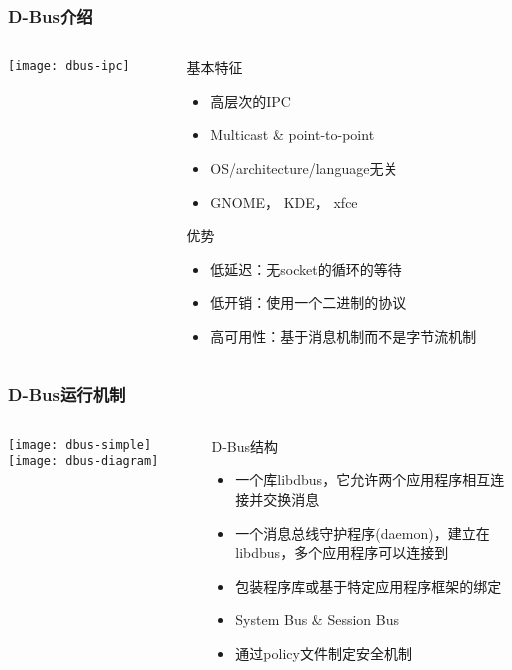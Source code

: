 \begin{frame}[fragile]
	\frametitle{D-Bus介绍}
	
	\begin{columns}
		\begin{column}{.4\textwidth}
			
			\texttt{[image: dbus-ipc]}
			
		\end{column}
		\begin{column}{.6\textwidth}
			基本特征
			\begin{itemize}
				\item 高层次的IPC
				\item Multicast \& point-to-point
				\item OS/architecture/language无关
				\item GNOME， KDE， xfce
			\end{itemize}
			优势
			\begin{itemize}
				\item 低延迟：无socket的循环的等待
				\item 低开销：使用一个二进制的协议
				\item 高可用性：基于消息机制而不是字节流机制
			\end{itemize}
		\end{column}
	\end{columns}
\end{frame}
\begin{frame}[fragile]
	\frametitle{D-Bus运行机制}
	
	\begin{columns}
		\begin{column}{.4\textwidth}
			
			\texttt{[image: dbus-simple]}
			\texttt{[image: dbus-diagram]}
			
		\end{column}
		\begin{column}{.6\textwidth}
			D-Bus结构
			\begin{itemize}
				\item 一个库libdbus，它允许两个应用程序相互连接并交换消息
				\item 一个消息总线守护程序(daemon)，建立在libdbus，多个应用程序可以连接到
				\item 包装程序库或基于特定应用程序框架的绑定
				\item System Bus \& Session Bus
				\item 通过policy文件制定安全机制

			\end{itemize}
		\end{column}
	\end{columns}
\end{frame}

